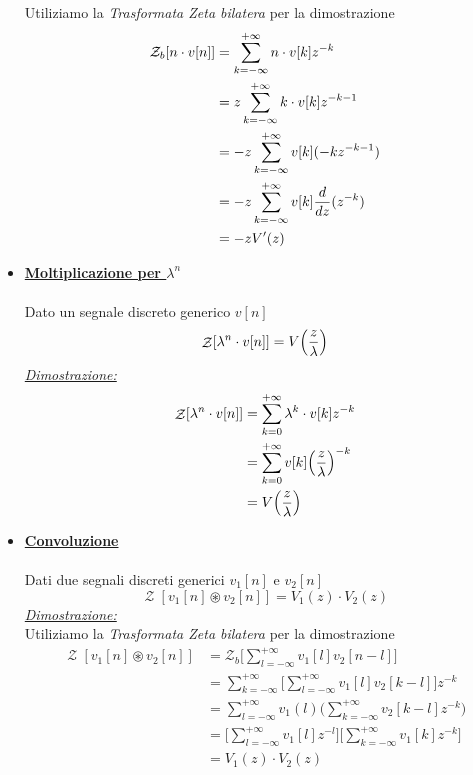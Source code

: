 \documentclass{article}
\newcommand{\Ztransf}{\mathop{\mathcal{Z}}}
\begin{document}
\begin{itemize}
					  Utiliziamo la \textit{Trasformata Zeta bilatera} per la dimostrazione
					  \[
					  	\begin{aligned}
					  		\mathcal{Z}_b[n\cdot v[n]] &= \sum_{k=-\infty}^{+\infty} {n\cdot v[k] z^{-k}} \\
							&= z \sum_{k=-\infty}^{+\infty} {k\cdot v[k] z^{-k - 1}} \\
							&= -z \sum_{k=-\infty}^{+\infty} {v[k] (-kz^{-k - 1})} \\
							&= -z \sum_{k=-\infty}^{+\infty} {v[k] {{d}\over{dz}}(z^{-k})} \\
							&= -z V'(z)
					  	\end{aligned}
					  \]
				\newpage
				\item \underline{\textbf{Moltiplicazione per $ \lambda^n $}} \\
					  \\
					  Dato un segnale discreto generico $ v[n] $
					  \[
					  	\Ztransf[\lambda^n \cdot v[n]] = V\Big( {{z}\over{\lambda}} \Big)
					  \]
					  \underline{\textit{Dimostrazione:}} \\
					  \[
					  	\begin{aligned}
							\Ztransf[\lambda^n \cdot v[n]] &= \sum_{k=0}^{+\infty} {\lambda^k \cdot v[k] z^{-k}} \\
							&= \sum_{k=0}^{+\infty} {v[k] \Big( {{z}\over{\lambda}} \Big)^{-k}} \\
					  		&= V\Big( {{z}\over{\lambda}} \Big)
					  	\end{aligned}
					  \]
				\item \underline{\textbf{Convoluzione}} \\
					  \\
					  Dati due segnali discreti generici $ v_1[n] \text{ e } v_2[n] $
					  \[
					  	\Ztransf[v_1[n] \circledast v_2[n]] = V_1(z)\cdot V_2(z)
					  \]
					  \underline{\textit{Dimostrazione:}} \\
					  Utiliziamo la \textit{Trasformata Zeta bilatera} per la dimostrazione
					  \[
					  	\begin{aligned}
					  		\Ztransf[v_1[n] \circledast v_2[n]] &= \mathcal{Z}_b\Bigg[ \sum_{l=-\infty}^{+\infty} {v_1[l]v_2[n-l]} \Bigg] \\
							&= \sum_{k=-\infty}^{+\infty}\Bigg[ \sum_{l=-\infty}^{+\infty} {v_1[l]v_2[k-l]} \Bigg]z^{-k} \\
							&= \sum_{l=-\infty}^{+\infty} {v_1(l) \Bigg(\sum_{k=-\infty}^{+\infty} {v_2[k-l] z^{-k}}\Bigg)} \\
							&= \Bigg[ \sum_{l=-\infty}^{+\infty} {v_1[l]z^{-l}} \Bigg] \Bigg[ \sum_{k=-\infty}^{+\infty} {v_1[k]z^{-k}} \Bigg] \\
							&= V_1(z)\cdot V_2(z)
					  	\end{aligned}
					  \]
			\end{itemize}
\end{document}
